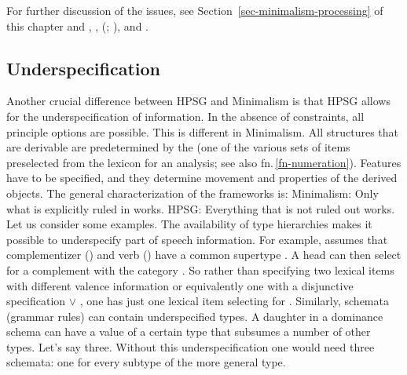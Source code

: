 \documentclass[output=paper,biblatex,babelshorthands,newtxmath,draftmode,colorlinks,citecolor=brown]{langscibook}
\begin{document}
For further discussion of the issues, see Section~\ref{sec-minimalism-processing} of
this chapter and \eg \citet{PS2001a}, \citet{Postal2003a}, \citeauthor{SW2011a}
(\citeyear[Section~10.4.2]{SW2011a}; \citeyear[]{SW2015a}), and .  

\subsection{Underspecification}

Another crucial difference between HPSG and Minimalism is that HPSG allows for the underspecification of
information. In the absence of constraints, all principle options are possible. This is different in
Minimalism. All structures that are derivable are predetermined by the  (one of the
various sets of items preselected from the lexicon for an analysis; see also fn.\,\ref{fn-numeration}). Features have to
be specified, and they determine movement and properties of the derived objects. The general
characterization of the frameworks is: 
\eal
\ex Minimalism: Only what is explicitly ruled in works. 
\ex HPSG: Everything that is not ruled out works.
\zl
Let us consider some examples. 
The availability of type hierarchies makes it possible to underspecify part of speech
information. For example, \citet[]{Sag97a} assumes that complementizer () and verb
() have a common supertype . A head can then select for a complement with the category . So rather
than specifying two lexical items with different valence information or equivalently one with a disjunctive
specification  $\vee$ , one has just one lexical item selecting for
. Similarly, schemata (grammar rules) can contain underspecified types. A daughter in a
dominance schema can have a value of a certain type that subsumes a number of other
types. Let's say three. Without this underspecification one would need three schemata: one for every
subtype of the more general type.
\end{document}
